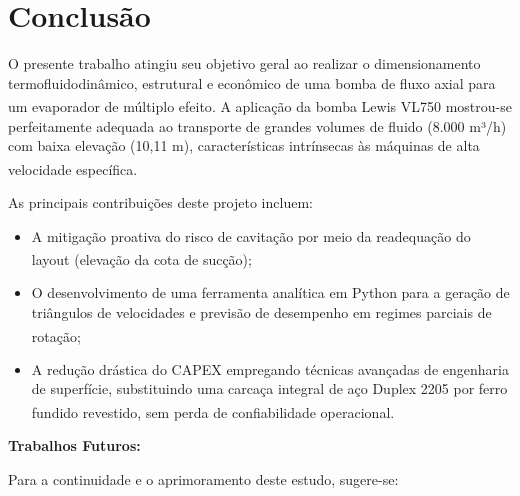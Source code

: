 \chapter{Conclusão}
\label{ch:conclusao}

O presente trabalho atingiu seu objetivo geral ao realizar o dimensionamento termofluidodinâmico, estrutural e econômico de uma bomba de fluxo axial para um evaporador de múltiplo efeito\textsuperscript{}. A aplicação da bomba Lewis VL750 mostrou-se perfeitamente adequada ao transporte de grandes volumes de fluido (8.000 m³/h) com baixa elevação (10,11 m), características intrínsecas às máquinas de alta velocidade específica\textsuperscript{}\textsuperscript{}\textsuperscript{}\textsuperscript{}\textsuperscript{}\textsuperscript{}\textsuperscript{}\textsuperscript{}\textsuperscript{}.


As principais contribuições deste projeto incluem:

\begin{itemize}
    \item A mitigação proativa do risco de cavitação por meio da readequação do layout (elevação da cota de sucção)\textsuperscript{};





    \item O desenvolvimento de uma ferramenta analítica em Python para a geração de triângulos de velocidades e previsão de desempenho em regimes parciais de rotação\textsuperscript{}\textsuperscript{}\textsuperscript{}\textsuperscript{};





    \item A redução drástica do CAPEX empregando técnicas avançadas de engenharia de superfície, substituindo uma carcaça integral de aço Duplex 2205 por ferro fundido revestido, sem perda de confiabilidade operacional\textsuperscript{}.


\end{itemize}
\textbf{Trabalhos Futuros:}

Para a continuidade e o aprimoramento deste estudo, sugere-se:

